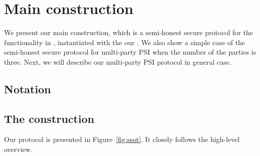 
\section{Main construction}

We present our main construction, which is a semi-honest secure protocol for the functionality in , instantiated with the our \SSOT. We also show a simple case of the semi-honest secure protocol for multi-party PSI when the number of the parties is three. Next, we will describe our multi-party PSI protocol in general case. 
 

\subsection{Notation}

\subsection{The \SSOT construction}
\label{sect:ssot-construction}


Our \SSOT protocol is presented in Figure~\ref{fig:ssot}. It closely follows the high-level overview. 


